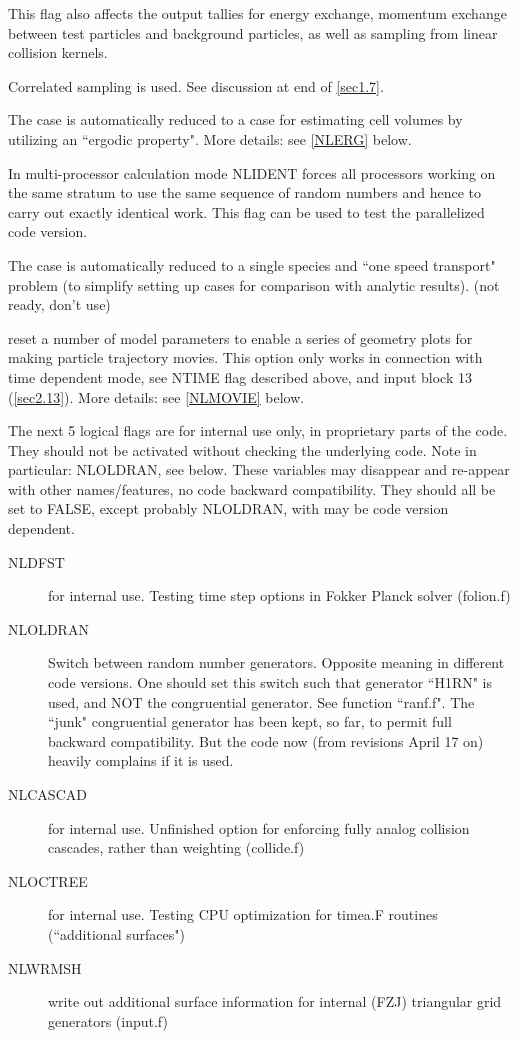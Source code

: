 \begin{description}
        This flag also affects the output tallies for energy exchange, momentum
        exchange between test particles and background particles, as well as sampling
        from linear collision kernels.
  \item[NLCRR] Correlated sampling is used.
        See discussion at end of \cref{sec1.7}.
  \item[NLERG] The case is automatically reduced to a case for estimating cell
        volumes by utilizing an ``ergodic property".
        More details: see \cref{NLERG} below.
  \item[NLIDENT] In multi-processor calculation mode NLIDENT forces all
        processors working on the same stratum to use the same sequence of random
        numbers and hence to carry out exactly identical work.
        This flag can be used to test the parallelized code version.
  \item[NLONE] The case is automatically reduced to a single species and ``one
        speed transport" problem (to simplify setting up cases for comparison with
        analytic results).
        (not ready, don't use)
  \item[NLMOVIE] reset a number of model parameters to
        enable a series of geometry plots for making particle trajectory movies.
        This option only works in connection with time dependent mode, see NTIME flag
        described above, and input block 13 (\cref{sec2.13}).
        More details: see \cref{NLMOVIE} below.
\end{description}
The next 5 logical flags are for internal use only, in proprietary parts of the
code.
They should not be activated without checking the underlying code.
Note in particular:  NLOLDRAN, see below.
These variables may disappear and re-appear with other names/features, no code
backward compatibility.
They should all be set to FALSE, except probably NLOLDRAN, with may be code
version dependent.
\begin{description}
  \item[NLDFST] for internal use.
        Testing time step options in Fokker Planck solver (folion.f)
  \item[NLOLDRAN]
        Switch between random number generators.
        Opposite meaning in different code versions.
        One should set this switch such that generator ``H1RN" is used, and NOT the
        congruential generator.
        See function ``ranf.f".
        The ``junk" congruential generator has been kept, so far, to permit full
        backward compatibility.
        But the code now (from revisions April 17 on) heavily complains if it is used.
  \item[NLCASCAD] for internal use.
        Unfinished option for enforcing fully analog collision cascades, rather than
        weighting  (collide.f)
  \item[NLOCTREE] for internal use.
        Testing CPU optimization for timea.F routines (``additional surfaces")
  \item[NLWRMSH] write out additional surface information for internal (FZJ)
        triangular grid generators (input.f)
\end{description}
